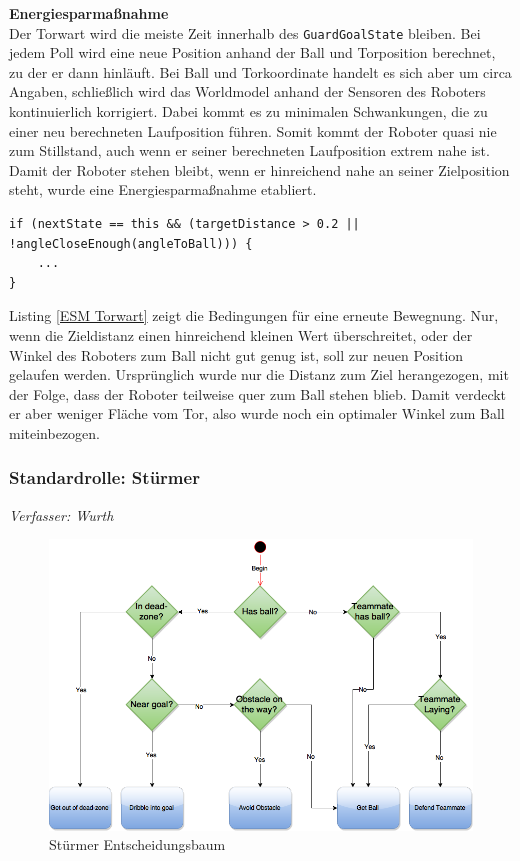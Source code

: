 \documentclass[fontsize=12pt,a4paper,final]{scrartcl}[2003/01/01]
\makeatletter
\def\ScaleIfNeeded{%
	\ifdim\Gin@nat@width>\linewidth
		\linewidth
	\else
		\Gin@nat@width
	\fi
}
\makeatother
\begin{document}
\textbf{Energiesparmaßnahme}
\\
Der Torwart wird die meiste Zeit innerhalb des \lstinline$GuardGoalState$ bleiben. Bei jedem Poll wird eine neue Position anhand der Ball und Torposition berechnet, zu der er dann hinläuft. Bei Ball und Torkoordinate handelt es sich aber um circa Angaben, schließlich wird das Worldmodel anhand der Sensoren des Roboters kontinuierlich korrigiert. Dabei kommt es zu minimalen Schwankungen, die zu einer neu berechneten Laufposition führen. Somit kommt der Roboter quasi nie zum Stillstand, auch wenn er seiner berechneten Laufposition extrem nahe ist. Damit der Roboter stehen bleibt, wenn er hinreichend nahe an seiner Zielposition steht, wurde eine Energiesparmaßnahme etabliert.
\\

\begin{lstlisting}[caption=Energiesparmaßnahme Torwart, captionpos=b, label= ESM Torwart]
if (nextState == this && (targetDistance > 0.2 || !angleCloseEnough(angleToBall))) {
	...
} 

\end{lstlisting}

Listing \ref{ESM Torwart} zeigt die Bedingungen für eine erneute Bewegnung. Nur, wenn die Zieldistanz einen hinreichend kleinen Wert überschreitet, oder der Winkel des Roboters zum Ball nicht gut genug ist, soll zur neuen Position gelaufen werden. Ursprünglich wurde nur die Distanz zum Ziel herangezogen, mit der Folge, dass der Roboter teilweise quer zum Ball stehen blieb. Damit verdeckt er aber weniger Fläche vom Tor, also wurde noch ein optimaler Winkel zum Ball miteinbezogen.
\subsubsection{Standardrolle: Stürmer}
\textit{Verfasser: Wurth}\\

\begin{figure}[H]
	\centering
	\includegraphics[width=\ScaleIfNeeded]{Grafiken/KI/attackerCenter_v2}
	\caption{Stürmer Entscheidungsbaum}
	\label{Stürmer Entscheidungsbaum}
\end{figure}
\end{document}
